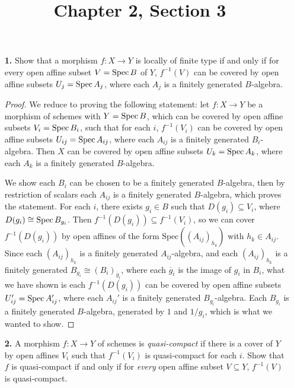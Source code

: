 \documentclass{article}
\title{Chapter 2, Section 3}
\begin{document}
\maketitle
\begin{enumerate} [label=\textbf{\arabic*.}, leftmargin=0em]

\item[\textbf{1.}] Show that a morphism $f : X \to Y$ is locally of finite type if and only if for every open affine subset $V = \operatorname{Spec}{B}$ of $Y$, $f^{-1}(V)$ can be covered by open affine subsets $U_j = \operatorname{Spec}{A_j}$, where each $A_j$ is a finitely generated $B$-algebra.

\begin{proof}
    We reduce to proving the following statement: let $f : X \to Y$ be a morphism of schemes with $Y = \operatorname{Spec}{B}$, which can be covered by open affine subsets $V_i = \operatorname{Spec}{B_i}$, such that for each $i$, $f^{-1}(V_i)$ can be covered by open affine subsets $U_{ij} = \operatorname{Spec}{A_{ij}}$, where each $A_{ij}$ is a finitely generated $B_i$-algebra. Then $X$ can be covered by open affine subsets $U_k = \operatorname{Spec}{A_k}$, where each $A_k$ is a finitely generated $B$-algebra.
    
    We show each $B_i$ can be chosen to be a finitely generated $B$-algebra, then by restriction of scalars each $A_{ij}$ is a finitely generated $B$-algebra, which proves the statement. For each $i$, there exists $g_i \in B$ such that $D(g_i) \subseteq V_i$, where $D(g_i) \cong \operatorname{Spec}{B_{g_i}}$. Then $f^{-1}(D(g_i)) \subseteq f^{-1}(V_i)$, so we can cover $f^{-1}(D(g_i))$ by open affines of the form $\text{Spec}((A_{ij})_{h_k})$ with $h_k \in A_{ij}$. Since each $(A_{ij})_{h_k}$ is a finitely generated $A_{ij}$-algebra, and each $(A_{ij})_{h_k}$ is a finitely generated $B_{g_i} \cong (B_i)_{\overline{g}_i}$, where each $\overline{g}_i$ is the image of $g_i$ in $B_i$, what we have shown is each $f^{-1}(D(g_i))$ can be covered by open affine subsets $U_{ij}' = \operatorname{Spec}{A'_{ij}}$, where each $A_{ij}'$ is a finitely generated $B_{g_i}$-algebra. Each $B_{g_i}$ is a finitely generated $B$-algebra, generated by $1$ and $1 / g_i$, which is what we wanted to show.
\end{proof}

\item[\textbf{2.}] A morphism $f : X \to Y$ of schemes is \textit{quasi-compact} if there is a cover of $Y$ by open affines $V_i$ such that $f^{-1}(V_i)$ is quasi-compact for each $i$. Show that $f$ is quasi-compact if and only if for \textit{every} open affine subset $V \subseteq Y$, $f^{-1}(V)$ is quasi-compact.


\end{enumerate}
\end{document}
